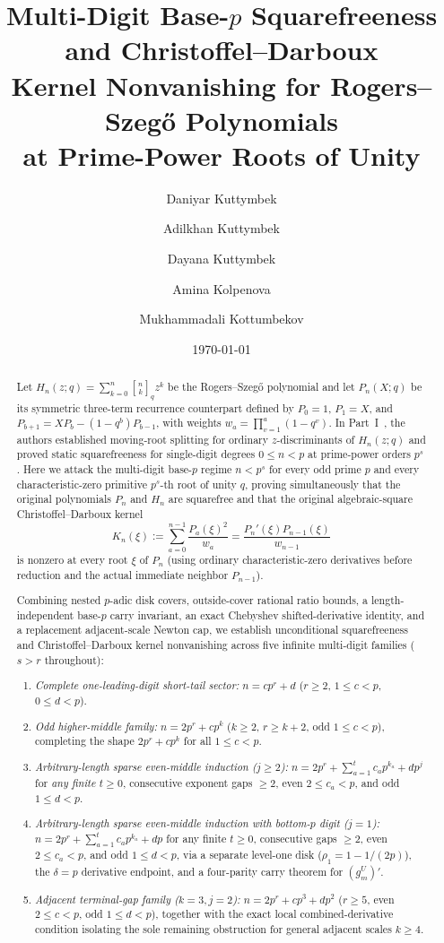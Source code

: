 \documentclass[11pt,reqno]{amsart}
\title[Multi-Digit Base-$p$ Squarefreeness for Rogers--Szeg\H{o} Polynomials]{Multi-Digit Base-$p$ Squarefreeness and Christoffel--Darboux\\Kernel Nonvanishing for Rogers--Szeg\H{o} Polynomials\\at Prime-Power Roots of Unity}
\author[D. Kuttymbek]{Daniyar Kuttymbek}
\author[A. Kuttymbek]{Adilkhan Kuttymbek}
\author[D. Kuttymbek]{Dayana Kuttymbek}
\author[A. Kolpenova]{Amina Kolpenova}
\author[M. Kottumbekov]{Mukhammadali Kottumbekov}
\date{\today}
\numberwithin{equation}{section}
\theoremstyle{definition}
\theoremstyle{remark}
\newcommand{\qbin}[2]{\genfrac{[}{]}{0pt}{}{#1}{#2}_q}
\begin{document}
\begin{abstract}
Let $H_n(z;q)=\sum_{k=0}^n \qbin{n}{k} z^k$ be the Rogers--Szeg\H{o} polynomial and let $P_n(X;q)$ be its symmetric three-term recurrence counterpart defined by $P_0=1$, $P_1=X$, and $P_{b+1}=XP_b-(1-q^b)P_{b-1}$, with weights $w_a=\prod_{v=1}^a(1-q^v)$. In Part~I~\cite{KKKKK26rs}, the authors established moving-root splitting for ordinary $z$-discriminants of $H_n(z;q)$ and proved static squarefreeness for single-digit degrees $0\le n<p$ at prime-power orders $p^s$. Here we attack the multi-digit base-$p$ regime $n < p^s$ for every odd prime $p$ and every characteristic-zero primitive $p^s$-th root of unity $q$, proving simultaneously that the original polynomials $P_n$ and $H_n$ are squarefree and that the original algebraic-square Christoffel--Darboux kernel
\[
K_n(\xi) := \sum_{a=0}^{n-1}\frac{P_a(\xi)^2}{w_a} = \frac{P_n'(\xi)P_{n-1}(\xi)}{w_{n-1}}
\]
is nonzero at every root $\xi$ of $P_n$ (using ordinary characteristic-zero derivatives before reduction and the actual immediate neighbor $P_{n-1}$).

Combining nested $p$-adic disk covers, outside-cover rational ratio bounds, a length-independent base-$p$ carry invariant, an exact Chebyshev shifted-derivative identity, and a replacement adjacent-scale Newton cap, we establish unconditional squarefreeness and Christoffel--Darboux kernel nonvanishing across five infinite multi-digit families ($s>r$ throughout):
\begin{enumerate}[label=(\arabic*),leftmargin=1.8em]
\item \emph{Complete one-leading-digit short-tail sector:} $n=cp^r+d$ ($r\ge 2$, $1\le c<p$, $0\le d<p$).
\item \emph{Odd higher-middle family:} $n=2p^r+cp^k$ ($k\ge 2$, $r\ge k+2$, odd $1\le c<p$), completing the shape $2p^r+cp^k$ for all $1\le c<p$.
\item \emph{Arbitrary-length sparse even-middle induction ($j\ge 2$):} $n=2p^r+\sum_{a=1}^t c_a p^{k_a} + dp^j$ for \emph{any finite $t\ge 0$}, consecutive exponent gaps $\ge 2$, even $2\le c_a<p$, and odd $1\le d<p$.
\item \emph{Arbitrary-length sparse even-middle induction with bottom-$p$ digit ($j=1$):} $n=2p^r+\sum_{a=1}^t c_a p^{k_a}+dp$ for any finite $t\ge 0$, consecutive gaps $\ge 2$, even $2\le c_a<p$, and odd $1\le d<p$, via a separate level-one disk ($\rho_1=1-1/(2p)$), the $\delta=p$ derivative endpoint, and a four-parity carry theorem for $(g_m^U)'$.
\item \emph{Adjacent terminal-gap family ($k=3,j=2$):} $n=2p^r+cp^3+dp^2$ ($r\ge 5$, even $2\le c<p$, odd $1\le d<p$), together with the exact local combined-derivative condition isolating the sole remaining obstruction for general adjacent scales $k\ge 4$.
\end{enumerate}
\end{abstract}
\end{document}
